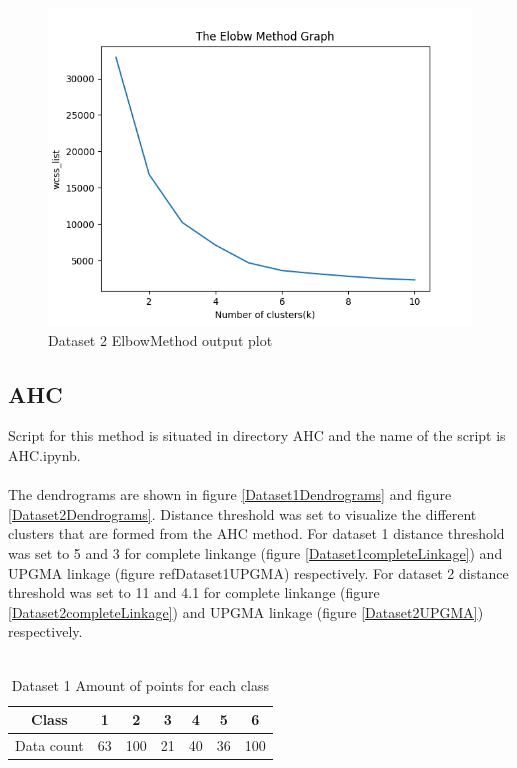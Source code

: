 \documentclass[12pt]{report}
\begin{document}
	\begin{figure}[H]
		\centering
		\includegraphics[scale=0.7]{../K-means/Output/Dataset2/ElbowMethod.png}
		\caption{Dataset 2 ElbowMethod output plot}
		\label{dataset2ElobowMethod}
	\end{figure}

	\newpage
	\subsection*{AHC}
	Script for this method is situated in directory AHC and the name of the script is AHC.ipynb. \\
	\\
	The dendrograms are shown in figure \ref{Dataset1Dendrograms} and figure \ref{Dataset2Dendrograms}. Distance threshold was set to visualize the different clusters that are formed from the AHC method. For dataset 1 distance threshold was set to 5 and 3 for complete linkange (figure \ref{Dataset1completeLinkage}) and UPGMA linkage (figure ref{Dataset1UPGMA}) respectively. For dataset 2 distance threshold was set to 11 and 4.1 for complete linkange (figure \ref{Dataset2completeLinkage}) and UPGMA linkage (figure \ref{Dataset2UPGMA}) respectively.\\
	\\
	\begin{table}[H]
		\centering
		\begin{tabular}{|c|c|c|c|c|c|c|}
			\hline
			Class & 1 & 2 & 3 & 4 & 5 & 6 \\
			\hline
			Data count & 63 & 100 & 21 & 40 & 36 & 100 \\
			\hline
		\end{tabular}
		\caption{Dataset 1 Amount of points for each class}
		\label{Dataset1ClassesCountTable}
	\end{table}
\end{document}
